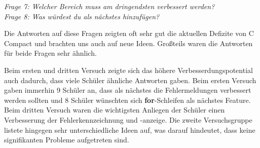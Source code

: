\emph{Frage 7: Welcher Bereich muss am dringendsten verbessert werden?\\
Frage 8: Was würdest du als nächstes hinzufügen?}

Die Antworten auf diese Fragen zeigten oft sehr gut die aktuellen Defizite von C Compact und brachten uns auch auf neue Ideen. Großteils waren die Antworten für beide Fragen sehr ähnlich.

Beim ersten und dritten Versuch zeigte sich das höhere Verbesserdungspotential auch dadurch, dass viele Schüler ähnliche Antworten gaben. Beim ersten Versuch 
gaben immerhin 9 Schüler an, dass als nächstes die Fehlermeldungen verbessert werden sollten und 8 Schüler wünschten sich \textbf{for}-Schleifen als nächstes Feature. Beim dritten Versuch waren die wichtigsten Anliegen der Schüler einen Verbesserung der Fehlerkennzeichnung und -anzeige. Die zweite Versuchsgruppe listete hingegen sehr unterschiedliche Ideen auf, was darauf hindeutet, dass keine signifikanten Probleme aufgetreten sind.
